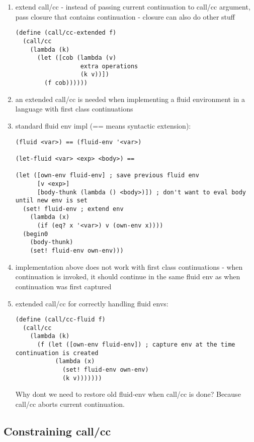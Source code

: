 \documentclass[letterpaper]{llncs}
\begin{document}
\begin{enumerate}
	\item extend call/cc - instead of passing current continuation to call/cc argument, pass closure that contains continuation - closure can also do other stuff
\begin{verbatim}
(define (call/cc-extended f)
  (call/cc
    (lambda (k)
      (let ([cob (lambda (v)
                  extra operations
                  (k v))])
        (f cob))))))
\end{verbatim}
	\item an extended call/cc is needed when implementing a fluid environment in a language with first class continuations
	\item standard fluid env impl (== means syntactic extension):
\begin{verbatim}
(fluid <var>) == (fluid-env '<var>)

(let-fluid <var> <exp> <body>) ==

(let ([own-env fluid-env] ; save previous fluid env
      [v <exp>]
      [body-thunk (lambda () <body>)]) ; don't want to eval body until new env is set
  (set! fluid-env ; extend env
    (lambda (x)
      (if (eq? x '<var>) v (own-env x))))
  (begin0
    (body-thunk)
    (set! fluid-env own-env)))
\end{verbatim}
	\item implementation above does not work with first class continuations - when continuation is invoked, it should continue in the same fluid env as when continuation was first captured
	\item extended call/cc for correctly handling fluid envs:
\begin{verbatim}
(define (call/cc-fluid f)
  (call/cc
    (lambda (k)
      (f (let ([own-env fluid-env]) ; capture env at the time continuation is created
           (lambda (x)
             (set! fluid-env own-env)
             (k v)))))))
\end{verbatim}
Why dont we need to restore old fluid-env when call/cc is done? Because call/cc aborts current continuation.
\end{enumerate}

\subsection*{Constraining call/cc}
\end{document}
